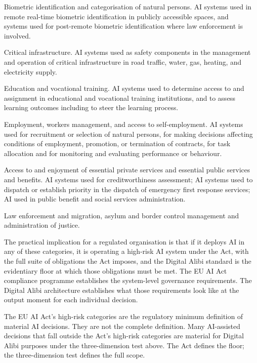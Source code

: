 Biometric identification and categorisation of natural persons. AI systems used in remote real-time biometric identification in publicly accessible spaces, and systems used for post-remote biometric identification where law enforcement is involved.

Critical infrastructure. AI systems used as safety components in the management and operation of critical infrastructure in road traffic, water, gas, heating, and electricity supply.

Education and vocational training. AI systems used to determine access to and assignment in educational and vocational training institutions, and to assess learning outcomes including to steer the learning process.

Employment, workers management, and access to self-employment. AI systems used for recruitment or selection of natural persons, for making decisions affecting conditions of employment, promotion, or termination of contracts, for task allocation and for monitoring and evaluating performance or behaviour.

Access to and enjoyment of essential private services and essential public services and benefits. AI systems used for creditworthiness assessment; AI systems used to dispatch or establish priority in the dispatch of emergency first response services; AI used in public benefit and social services administration.

Law enforcement and migration, asylum and border control management and administration of justice.

The practical implication for a regulated organisation is that if it deploys AI in any of these categories, it is operating a high-risk AI system under the Act, with the full suite of obligations the Act imposes, and the Digital Alibi standard is the evidentiary floor at which those obligations must be met. The EU AI Act compliance programme establishes the system-level governance requirements. The Digital Alibi architecture establishes what those requirements look like at the output moment for each individual decision.

The EU AI Act's high-risk categories are the regulatory minimum definition of material AI decisions. They are not the complete definition. Many AI-assisted decisions that fall outside the Act's high-risk categories are material for Digital Alibi purposes under the three-dimension test above. The Act defines the floor; the three-dimension test defines the full scope.

\scenebreak

